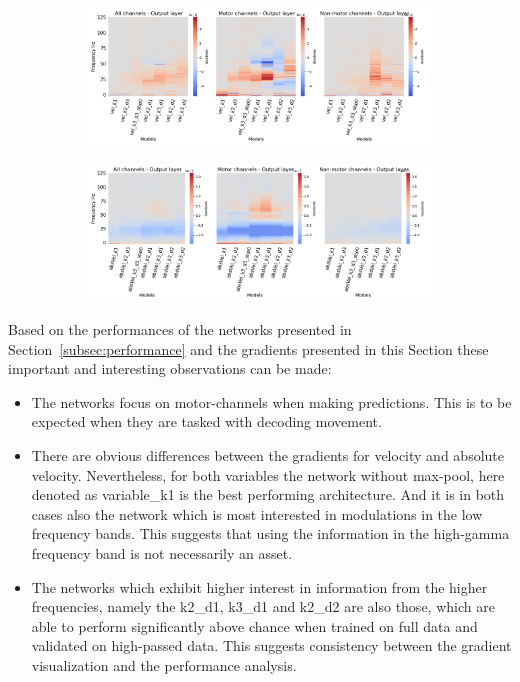 \begin{figure}[!htpb]
\centering
\begin{subfigure}[b]{\textwidth}
   \includegraphics[width=1\linewidth]{img/ch4/vel-last-layer-grads}
   \caption{}
\end{subfigure}\label{fig:absVel-last-layer-grads}

\begin{subfigure}[b]{\textwidth}
   \includegraphics[width=1\linewidth]{img/ch4/absVel-last-layer-grads}
   \caption{}
\end{subfigure}\label{fig:vel-last-layer-grads}
\caption[]{}
\end{figure}\label{fig:last-layer-grads}

Based on the performances of the networks presented in Section~\ref{subsec:performance} and the gradients presented in this Section these important and interesting observations can be made:

\begin{itemize}
    \item The networks focus on motor-channels when making predictions.
This is to be expected when they are tasked with decoding movement.
    \item There are obvious differences between the gradients for velocity and absolute velocity.
    Nevertheless, for both variables the network without max-pool, here denoted as {variable}\_k1 is the best performing architecture.
    And it is in both cases also the network which is most interested in modulations in the low frequency bands.
    This suggests that using the information in the high-gamma frequency band is not necessarily an asset.
    \item The networks which exhibit higher interest in information from the higher frequencies, namely the k2\_d1, k3\_d1 and k2\_d2 are also those, which are able to perform significantly above chance when trained on full data and validated on high-passed data.
    This suggests consistency between the gradient visualization and the performance analysis.

\end{itemize}


